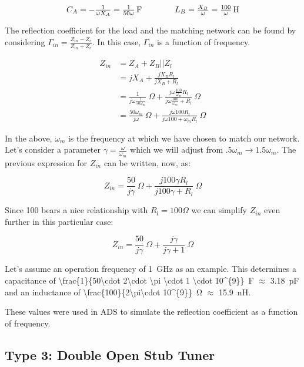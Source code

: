 \[
\arraycolsep=20pt
\begin{array}{cc}
    C_A = -\frac{1}{\omega X_A} = 
        \SI[parse-numbers = false]{\frac{1}{50\omega}}{\farad} & 
    L_B = \frac{X_B}{\omega} = 
        \SI[parse-numbers = false]{\frac{100}{\omega}}{\henry}
\end{array}
\]

The reflection coefficient for the load and the matching network can be found by
considering $ \Gamma_{in} = \frac{Z_{in} - Z_c}{Z_{in} + Z_c} $. In this case,
$\Gamma_{in}$ is a function of frequency.

\begin{align*}
    Z_{in} &= Z_A + Z_B||Z_l \\
           &= j X_A + \frac{j X_B R_l }{jX_B + R_l} \\
           &= \frac{1}{j \omega \frac{1}{50 \omega_m}}~\Omega + \frac{j \omega
\frac{100}{\omega_m}R_l}{j \omega \frac{100}{\omega_m} + R_l}~\Omega \\
&= \frac{50 \omega_m}{j \omega}~\Omega + \frac{j \omega 100 R_l}{j \omega 100 +
\omega_m R_l}~\Omega
\end{align*}

In the above, $\omega_m$ is the frequency at which we have chosen to match our
network. Let's consider a parameter $\gamma = \frac{\omega}{\omega_m}$ which we
will adjust from $.5\omega_m \rightarrow 1.5\omega_m$. The previous expression
for $Z_{in}$ can be written, now, as:

\[ 
        Z_{in} = \frac{50}{j \gamma}~\Omega + \frac{j 100 \gamma R_l}{j 100 \gamma +
        R_l}~\Omega
\]

Since 100 bears a nice relationship with $R_l = 100 \Omega $ we can simplify
$Z_{in}$ even further in this particular case:

\[ 
        Z_{in} = \frac{50}{j \gamma}~\Omega + \frac{j \gamma }{j \gamma +
        1}~\Omega
\]

Let's assume an operation frequency of \SI{1}{\giga\hertz} as an example. This
determines a capacitance of \SI[parse-numbers=false]{\frac{1}{50\cdot 2\cdot \pi
\cdot 1 \cdot 10^{9}}}{\farad} $ \approx $ \SI{3.18}{\pico\farad} and an
inductance of \SI[parse-numbers=false]{\frac{100}{2\pi\cdot 10^{9}}}{\ohm}
$\approx$ \SI{15.9}{\nano\henry}.

These values were used in ADS to simulate the reflection coefficient as a
function of frequency. 
\subsection{Type 3: Double Open Stub Tuner}

